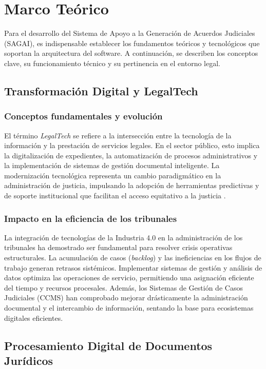 \section{Marco Teórico}
\label{ch:marco_teorico}

Para el desarrollo del Sistema de Apoyo a la Generación de Acuerdos Judiciales (SAGAI), es indispensable establecer los fundamentos teóricos y tecnológicos que soportan la arquitectura del software. A continuación, se describen los conceptos clave, su funcionamiento técnico y su pertinencia en el entorno legal.

\subsection{Transformación Digital y LegalTech}

\subsubsection{Conceptos fundamentales y evolución}
El término \textit{LegalTech} se refiere a la intersección entre la tecnología de la información y la prestación de servicios legales. En el sector público, esto implica la digitalización de expedientes, la automatización de procesos administrativos y la implementación de sistemas de gestión documental inteligente. La modernización tecnológica representa un cambio paradigmático en la administración de justicia, impulsando la adopción de herramientas predictivas y de soporte institucional que facilitan el acceso equitativo a la justicia \cite{Frontiers2025}. 

\subsubsection{Impacto en la eficiencia de los tribunales}
La integración de tecnologías de la Industria 4.0 en la administración de los tribunales ha demostrado ser fundamental para resolver crisis operativas estructurales. La acumulación de casos (\textit{backlog}) y las ineficiencias en los flujos de trabajo generan retrasos sistémicos. Implementar sistemas de gestión y análisis de datos optimiza las operaciones de servicio, permitiendo una asignación eficiente del tiempo y recursos procesales. Además, los Sistemas de Gestión de Casos Judiciales (CCMS) han comprobado mejorar drásticamente la administración documental y el intercambio de información, sentando la base para ecosistemas digitales eficientes.

\subsection{Procesamiento Digital de Documentos Jurídicos}

